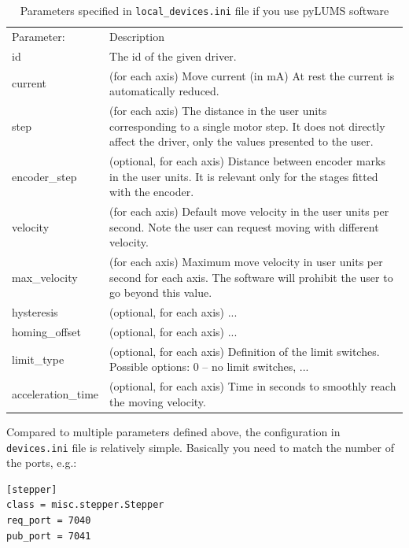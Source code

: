 \documentclass[10pt,article]{article}
\begin{document}
\begin{table}[H]\centering
\begin{tabularx}{\textwidth}{lX}
\rowcolor[gray]{0.80} Parameter: & Description  \\
\rowcolor[gray]{0.95} id & The id of the given driver. \vspace{2mm} \\
\rowcolor[gray]{0.95} current & (for each axis) Move current (in mA) At rest the current is automatically reduced. \vspace{2mm} \\
\rowcolor[gray]{0.95} step & (for each axis) The distance in the user units corresponding to a single motor step. It does not directly affect the driver, only the values presented to the user.\vspace{2mm} \\
\rowcolor[gray]{0.95} encoder\_step & (optional, for each axis) Distance between encoder marks in the user units. It is relevant only for the stages fitted with the encoder.  \vspace{2mm} \\
\rowcolor[gray]{0.95} velocity  & (for each axis) Default move velocity in the user units per second. Note the user can request moving with different velocity.  \\
\rowcolor[gray]{0.95} max\_velocity & (for each axis) Maximum move velocity in user units per second for each axis. The software will prohibit the user to go beyond this value. \\
\rowcolor[gray]{0.95} hysteresis & (optional, for each axis) ... \vspace{2mm} \\
\rowcolor[gray]{0.95} homing\_offset & (optional, for each axis) ... \vspace{2mm} \\
\rowcolor[gray]{0.95} limit\_type & (optional, for each axis) Definition of the limit switches. Possible options: 0 -- no limit switches, ...  \vspace{2mm} \\
\rowcolor[gray]{0.95} acceleration\_time & (optional, for each axis) Time in seconds to smoothly reach the moving velocity. \vspace{2mm} \\
\end{tabularx}
\caption{Parameters specified in \texttt{local\_devices.ini} file if you use pyLUMS software}\label{localdevicesini}
\end{table}

Compared to multiple parameters defined above, the configuration in \texttt{devices.ini}  file is relatively simple. Basically you need to match the number of the ports, e.g.:
\begin{verbatim}
[stepper]
class = misc.stepper.Stepper
req_port = 7040
pub_port = 7041
\end{verbatim}



\end{document}

